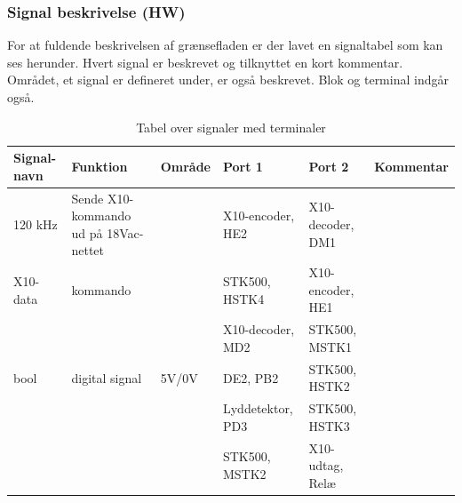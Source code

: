 \begin{table}[H]
\subsubsection{Signal beskrivelse (HW)}
For at fuldende beskrivelsen af grænsefladen er der lavet en signaltabel som kan ses herunder. Hvert signal er beskrevet og tilknyttet en kort kommentar. Området, et signal er defineret under, er også beskrevet. Blok og terminal indgår også. 
\caption{Tabel over signaler med terminaler}
\begin{small}
\begin{tabular}{|p{2cm}|p{2cm}|p{2cm}|p{2cm}|p{2cm}|p{}|}
\hline
\textbf{Signal-navn} & \textbf{Funktion} & \textbf{Område} & \textbf{Port 1} & \textbf{Port 2} & \textbf{Kommentar} \\ \hline

120 kHz & Sende X10-kommando ud på 18Vac-nettet & & X10-encoder, HE2 & X10-decoder, DM1 & \\ \hline

X10-data & kommando & & STK500, HSTK4 & X10-encoder, HE1 & \\ \cline{4-5}
&&& X10-decoder, MD2 & STK500, MSTK1 &\\ \hline

bool & digital signal & 5V/0V & DE2, PB2 & STK500, HSTK2 & \\ \cline{4-5}
&&& Lyddetektor, PD3 & STK500, HSTK3 & \\ \cline{4-5}
&&& STK500, MSTK2 & X10-udtag, Relæ & \\ \hline
\end{tabular}
\end{small}
\label{table:Signaltabel}
\end{table}



